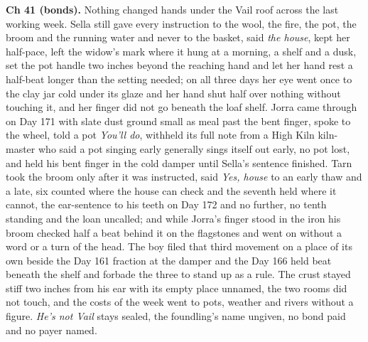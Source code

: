 \documentclass{design/chronicle}
\begin{document}
{\textbf{Ch 41 (bonds).} Nothing changed hands under the Vail roof across the last working week. Sella still gave every instruction to the wool, the fire, the pot, the broom and the running water and never to the basket, said \emph{the house}, kept her half-pace, left the widow’s mark where it hung at a morning, a shelf and a dusk, set the pot handle two inches beyond the reaching hand and let her hand rest a half-beat longer than the setting needed; on all three days her eye went once to the clay jar cold under its glaze and her hand shut half over nothing without touching it, and her finger did not go beneath the loaf shelf. Jorra came through on Day 171 with slate dust ground small as meal past the bent finger, spoke to the wheel, told a pot \emph{You’ll do}, withheld its full note from a High Kiln kiln-master who said a pot singing early generally sings itself out early, no pot lost, and held his bent finger in the cold damper until Sella’s sentence finished. Tarn took the broom only after it was instructed, said \emph{Yes, house} to an early thaw and a late, six counted where the house can check and the seventh held where it cannot, the ear-sentence to his teeth on Day 172 and no further, no tenth standing and the loan uncalled; and while Jorra’s finger stood in the iron his broom checked half a beat behind it on the flagstones and went on without a word or a turn of the head. The boy filed that third movement on a place of its own beside the Day 161 fraction at the damper and the Day 166 held beat beneath the shelf and forbade the three to stand up as a rule. The crust stayed stiff two inches from his ear with its empty place unnamed, the two rooms did not touch, and the costs of the week went to pots, weather and rivers without a figure. \emph{He’s not Vail} stays sealed, the foundling’s name ungiven, no bond paid and no payer named.

}
\end{document}
